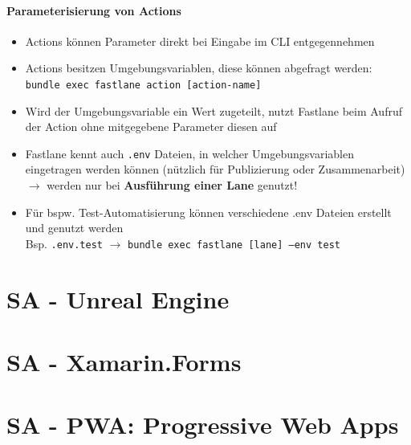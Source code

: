 \documentclass[a4paper]{article}
\begin{document}
		\paragraph{Parameterisierung von Actions}
		\begin{itemize}
			\item Actions können Parameter direkt bei Eingabe im CLI entgegennehmen
			\item Actions besitzen Umgebungsvariablen, diese können abgefragt werden: \\
				\texttt{bundle exec fastlane action [action-name]}
			\item Wird der Umgebungsvariable ein Wert zugeteilt, nutzt Fastlane beim Aufruf der Action ohne mitgegebene Parameter diesen auf
			\item Fastlane kennt auch \texttt{.env} Dateien, in welcher Umgebungsvariablen eingetragen werden können (nützlich für Publizierung oder Zusammenarbeit) $\rightarrow$ werden nur bei \textbf{Ausführung einer Lane} genutzt!
			\item Für bspw. Test-Automatisierung können verschiedene .env Dateien erstellt und genutzt werden \\
				Bsp. \texttt{.env.test} $\rightarrow$ \texttt{bundle exec fastlane [lane] --env test}
		\end{itemize}
	
	\section{SA - Unreal Engine}
	\label{section:unrealengine}
	
	
	\section{SA - Xamarin.Forms}
	\label{section:xamarinforms}
	
	
	\section{SA - PWA: Progressive Web Apps}
	\label{section:pwa}
	
	
\end{document}
